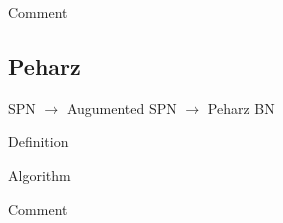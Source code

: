 Comment

\subsection{Peharz}

SPN $\rightarrow$ Augumented SPN $\rightarrow$ Peharz BN

Definition

Algorithm

Comment